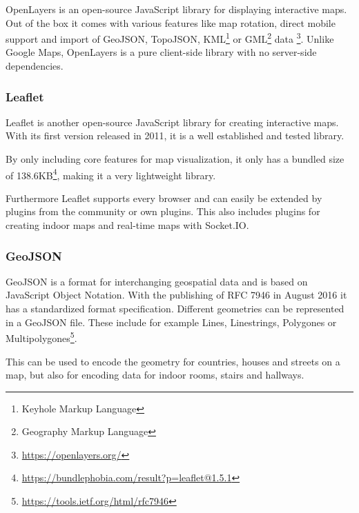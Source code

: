 OpenLayers is an open-source JavaScript library for displaying interactive maps. Out of the box it comes with various features like map rotation, direct mobile support and import of GeoJSON, TopoJSON, KML\footnote{Keyhole Markup Language} or GML\footnote{Geography Markup Language} data \footnote{\url{https://openlayers.org/}}. Unlike Google Maps, OpenLayers is a pure client-side library with no server-side dependencies. 



\subsubsection{Leaflet}
\label{Leaflet}

Leaflet is another open-source JavaScript library for creating interactive maps. With its first version released in 2011, it is a well established and tested library. 

By only including core features for map visualization, it only has a bundled size of 138.6KB\footnote{\url{https://bundlephobia.com/result?p=leaflet@1.5.1}}, making it a very lightweight library.

Furthermore Leaflet supports every browser and can easily be extended by plugins from the community or own plugins.
This also includes plugins for creating indoor maps \cite{baines_provides_2019} and real-time maps with Socket.IO.

\subsubsection{GeoJSON}
\label{GeoJSON}

GeoJSON is a format for interchanging geospatial data and is based on JavaScript Object Notation. With the publishing of RFC 7946 in August 2016 it has a standardized format specification.
Different geometries can be represented in a GeoJSON file. These include for example Lines, Linestrings, Polygones or Multipolygones\footnote{\url{https://tools.ietf.org/html/rfc7946}}. 

This can be used to encode the geometry for countries, houses and streets on a map, but also for encoding data for indoor rooms, stairs and hallways.

